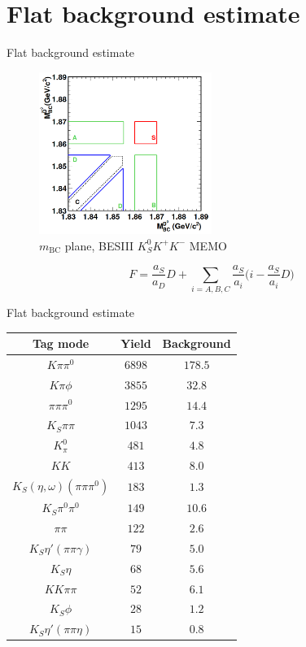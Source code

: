 \documentclass{beamer}
\begin{document}
\section{Flat background estimate}
\begin{frame}{Flat background estimate}
  \begin{figure}
    \centering
    \includegraphics[width=0.5\textwidth]{MBC2D.png}
    \caption{$m_\text{BC}$ plane, BESIII $K_S^0K^+K^-$ MEMO}
  \end{figure}
  \begin{equation*}
    F = \frac{a_S}{a_D}D + \sum_{i = A, B, C}\frac{a_S}{a_i}\Big(i - \frac{a_S}{a_i}D\Big)
  \end{equation*}
\end{frame}

\begin{frame}{Flat background estimate}
  \centering
  \begin{tabular}{ccc}
    Tag mode & Yield & Background \\
    \hline
    $K\pi\pi^0$                      & $6898$ & $178.5$ \\
    $K\pi\phi$                       & $3855$ & $32.8$  \\
    $\pi\pi\pi^0$                    & $1295$ & $14.4$  \\
    $K_S\pi\pi$                      & $1043$ & $7.3$   \\
    $K_\pi^0$                        & $481$  & $4.8$   \\
    $KK$                             & $413$  & $8.0$   \\
    $K_S(\eta, \omega)(\pi\pi\pi^0)$ & $183$  & $1.3$   \\
    $K_S\pi^0\pi^0$                  & $149$  & $10.6$  \\
    $\pi\pi$                         & $122$  & $2.6$   \\
    $K_S\eta'(\pi\pi\gamma)$         & $79$   & $5.0$   \\
    $K_S\eta$                        & $68$   & $5.6$   \\
    $KK\pi\pi$                       & $52$   & $6.1$   \\
    $K_S\phi$                        & $28$   & $1.2$   \\
    $K_S\eta'(\pi\pi\eta)$           & $15$   & $0.8$   \\
    \end{tabular}
\end{frame}
\end{document}
